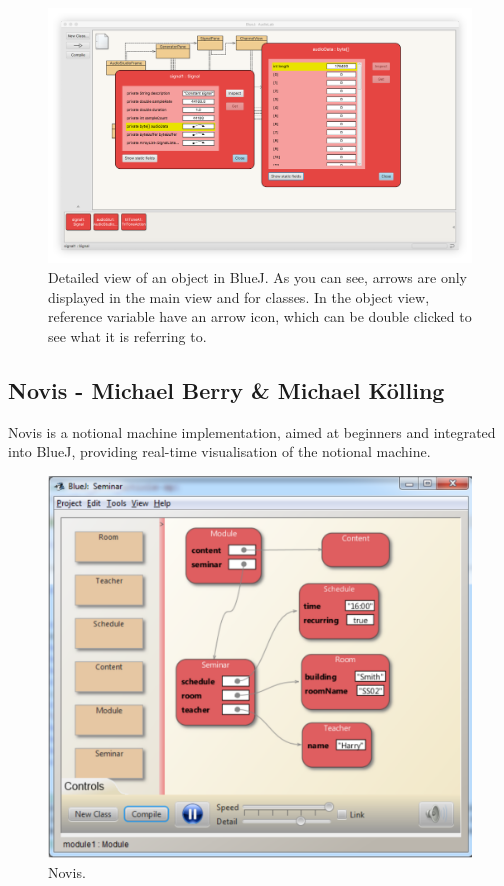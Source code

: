 \documentclass[]{usiinfbachelorproject}
\begin{document}
\begin{figure}[h!]
\centering
\includegraphics[width=\textwidth]{figures/bluej_objects_open.png}
\caption {Detailed view of an object in BlueJ. As you can see, arrows are only displayed in the main view and for classes. In the object view, reference variable have an arrow icon, which can be double clicked to see what it is referring to.}
\label {bluej_objects_open}
\end{figure}

\subsection{Novis - Michael Berry \& Michael K\"{o}lling}

Novis \cite{7743153} is a notional machine implementation, aimed at beginners and integrated into BlueJ, providing real-time visualisation of the notional machine.

\begin{figure}[h!]
\centering
\includegraphics[scale=0.4]{figures/Novis.png}
\caption {Novis.}
\end{figure}
\end{document}
